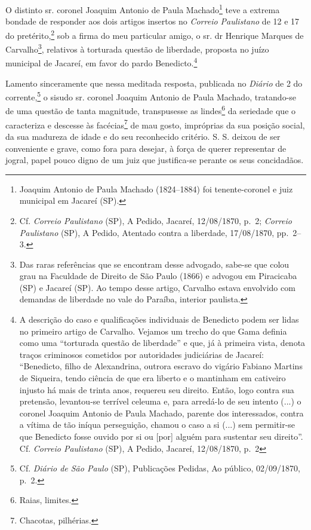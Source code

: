 {O distinto sr. coronel Joaquim Antonio de Paula Machado\footnote{
  Joaquim Antonio de Paula Machado (1824--1884) foi tenente-coronel e
  juiz municipal em Jacareí (SP).} teve a extrema bondade de responder
aos dois artigos insertos no \emph{Correio Paulistano} de 12 e 17 do
pretérito,\footnote{ Cf. \emph{Correio Paulistano} (SP), A Pedido,
  Jacareí, 12/08/1870, p.~2; \emph{Correio Paulistano} (SP), A Pedido,
  Atentado contra a liberdade, 17/08/1870, pp.~2--3.} sob a firma do meu
particular amigo, o sr. dr Henrique Marques de Carvalho\footnote{ Das
  raras referências que se encontram desse advogado, sabe-se que colou
  grau na Faculdade de Direito de São Paulo (1866) e advogou em
  Piracicaba (SP) e Jacareí (SP). Ao tempo desse artigo, Carvalho estava
  envolvido com demandas de liberdade no vale do Paraíba, interior
  paulista.}, relativos à torturada questão de liberdade, proposta no
juízo municipal de Jacareí, em favor do pardo Benedicto.\footnote{ A
  descrição do caso e qualificações individuais de Benedicto podem ser
  lidas no primeiro artigo de Carvalho. Vejamos um trecho do que Gama
  definia como uma ``torturada questão de liberdade'' e que, já à primeira
  vista, denota traços criminosos cometidos por autoridades judiciárias
  de Jacareí: ``Benedicto, filho de Alexandrina, outrora escravo do
  vigário Fabiano Martins de Siqueira, tendo ciência de que era liberto
  e o mantinham em cativeiro injusto há mais de trinta anos, requereu
  seu direito. Então, logo contra sua pretensão, levantou-se terrível
  celeuma e, para arredá-lo de seu intento (...) o coronel Joaquim
  Antonio de Paula Machado, parente dos interessados, contra a vítima de
  tão iníqua perseguição, chamou o caso a si (...) sem permitir-se que
  Benedicto fosse ouvido por si ou {[}por{]} alguém para sustentar seu
  direito''. Cf. \emph{Correio Paulistano} (SP), A Pedido, Jacareí,
  12/08/1870, p.~2}

Lamento sinceramente que nessa meditada resposta, publicada no
\emph{Diário} de 2 do corrente,\footnote{ Cf. \emph{Diário de São Paulo}
  (SP), Publicações Pedidas, Ao público, 02/09/1870, p.~2.} o sisudo sr.
coronel Joaquim Antonio de Paula Machado, tratando-se de uma questão de
tanta magnitude, transpusesse as lindes\footnote{ Raias, limites.} da
seriedade que o caracteriza e descesse às facécias\footnote{ Chacotas,
  pilhérias.} de mau gosto, impróprias da sua posição social, da sua
madureza de idade e do seu reconhecido critério. S. S. deixou de ser
conveniente e grave, como fora para desejar, à força de querer
representar de jogral, papel pouco digno de um juiz que justifica-se
perante os seus concidadãos.

}
